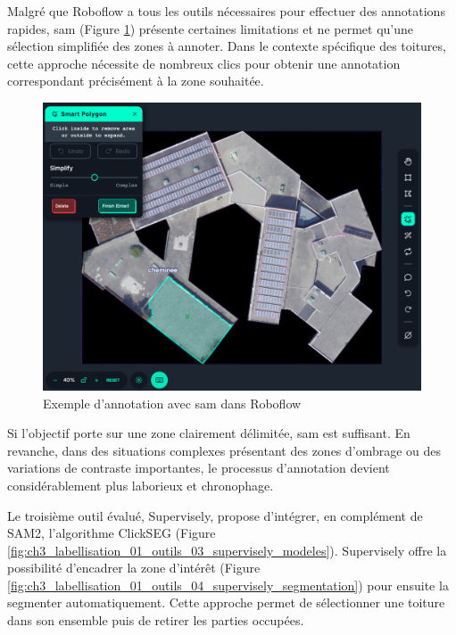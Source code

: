 Malgré que Roboflow a tous les outils nécessaires pour effectuer des annotations rapides, \acrshort{sam} (Figure \ref{fig:ch3_labellisation_01_outils_02_robolfow_sam}) présente certaines limitations et ne permet qu'une sélection simplifiée des zones à annoter. Dans le contexte spécifique des toitures, cette approche nécessite de nombreux clics pour obtenir une annotation correspondant précisément à la zone souhaitée. 

\begin{figure}[H]
    \centering
    \includegraphics[width=1\linewidth]{02-main/figures/ch3/ch3_labellisation_01_outils_02_robolfow_sam.png}
    \caption{Exemple d'annotation avec \acrshort{sam} dans Roboflow}
    \label{fig:ch3_labellisation_01_outils_02_robolfow_sam}
\end{figure}

Si l'objectif porte sur une zone clairement délimitée, \acrshort{sam} est suffisant. En revanche, dans des situations complexes présentant des zones d'ombrage ou des variations de contraste importantes, le processus d'annotation devient considérablement plus laborieux et chronophage.

Le troisième outil évalué, Supervisely, propose d'intégrer, en complément de SAM2, l'algorithme ClickSEG \cite{chen_conditional_2021} \cite{chen_focalclick_2022} (Figure \ref{fig:ch3_labellisation_01_outils_03_supervisely_modeles}). Supervisely offre la possibilité d'encadrer la zone d'intérêt (Figure \ref{fig:ch3_labellisation_01_outils_04_supervisely_segmentation}) pour ensuite la segmenter automatiquement. Cette approche permet de sélectionner une toiture dans son ensemble puis de retirer les parties occupées.

